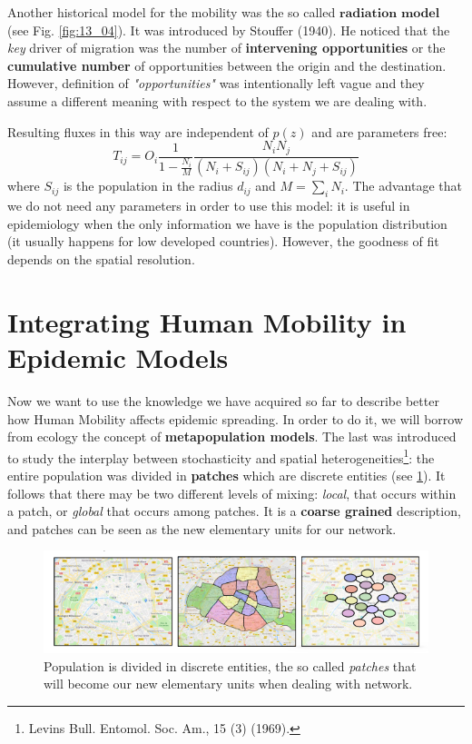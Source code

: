 \documentclass[../main/main.tex]{subfiles}
\begin{document}
Another historical model for the mobility was the so called $\textbf{radiation model}$ (see Fig. \ref{fig:13_04}). It was introduced by Stouffer (1940). He noticed that the \textit{key} driver of migration was the number of \textbf{intervening opportunities} or the \textbf{cumulative number} of opportunities between the origin and the destination. However, definition of \textit{"opportunities"} was intentionally left vague and they assume a different meaning with respect to the system we are dealing with.


Resulting fluxes in this way are independent of $p(z)$ and are parameters free:
\begin{equation}
    T_{ij} = O_i \frac{1}{1-\frac{N_i}{M}}\frac{N_i N_j}{(N_i+S_{ij})(N_i+N_j+S_{ij})}
\end{equation}
where $S_{ij}$ is the population in the radius $d_{ij}$ and $M = \sum_i N_i$. The advantage that we do not need any parameters in order to use this model: it is useful in epidemiology when the only information we have is the population distribution (it usually happens for low developed countries). However, the goodness of fit depends on the spatial resolution.



\section{Integrating Human Mobility in Epidemic Models}

Now we want to use the knowledge we have acquired so far to describe better how Human Mobility affects epidemic spreading. In order to do it, we will borrow from ecology the concept of \textbf{metapopulation models}. The last was introduced to study the interplay between stochasticity and spatial heterogeneities\footnote{Levins Bull. Entomol. Soc. Am., 15 (3) (1969).}: the entire population was divided in \textbf{patches} which are discrete entities (see \ref{fig:13_05}). It follows that there may be two different levels of mixing: \textit{local}, that occurs within a patch, or \textit{global} that occurs among patches. It is a \textbf{coarse grained} description, and patches can be seen as the new elementary units for our network.

\begin{figure}[h!]
\centering
\includegraphics[width=1\textwidth]{../lessons/image/14/image05.png}
\caption{\label{fig:13_05} Population is divided in discrete entities, the so called \textit{patches} that will become our new elementary units when dealing with network.}
\end{figure}
\end{document}
